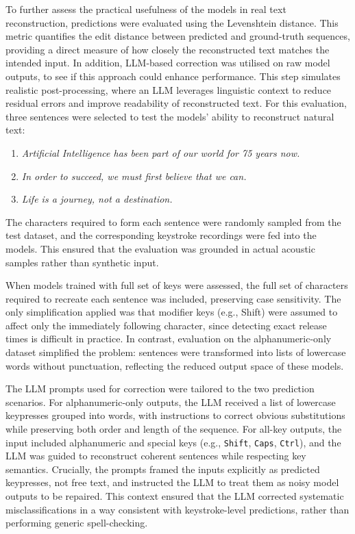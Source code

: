 \documentclass[a4paper,11pt,twoside]{report}
\theoremstyle{definition}
\begin{document}
To further assess the practical usefulness of the models in real text reconstruction, predictions were evaluated using the Levenshtein distance. This metric quantifies the edit distance between predicted and ground-truth sequences, providing a direct measure of how closely the reconstructed text matches the intended input. In addition, LLM-based correction was utilised on raw model outputs, to see if this approach could enhance performance. This step simulates realistic post-processing, where an LLM leverages linguistic context to reduce residual errors and improve readability of reconstructed text.
\newpage
For this evaluation, three sentences were selected to test the models’ ability to reconstruct natural text:
\begin{enumerate}
  \item \textit{Artificial Intelligence has been part of our world for 75 years now.}
  \item \textit{In order to succeed, we must first believe that we can.}
  \item \textit{Life is a journey, not a destination.}
\end{enumerate}
The characters required to form each sentence were randomly sampled from the test dataset, and the corresponding keystroke recordings were fed into the models. This ensured that the evaluation was grounded in actual acoustic samples rather than synthetic input.

When models trained with full set of keys were assessed, the full set of characters required to recreate each sentence was included, preserving case sensitivity. The only simplification applied was that modifier keys (e.g., Shift) were assumed to affect only the immediately following character, since detecting exact release times is difficult in practice. In contrast, evaluation on the alphanumeric-only dataset simplified the problem: sentences were transformed into lists of lowercase words without punctuation, reflecting the reduced output space of these models.

The LLM prompts used for correction were tailored to the two prediction scenarios. For alphanumeric-only outputs, the LLM received a list of lowercase keypresses grouped into words, with instructions to correct obvious substitutions while preserving both order and length of the sequence. For all-key outputs, the input included alphanumeric and special keys (e.g., \texttt{Shift}, \texttt{Caps}, \texttt{Ctrl}), and the LLM was guided to reconstruct coherent sentences while respecting key semantics. Crucially, the prompts framed the inputs explicitly as predicted keypresses, not free text, and instructed the LLM to treat them as noisy model outputs to be repaired. This context ensured that the LLM corrected systematic misclassifications in a way consistent with keystroke-level predictions, rather than performing generic spell-checking.
\end{document}
